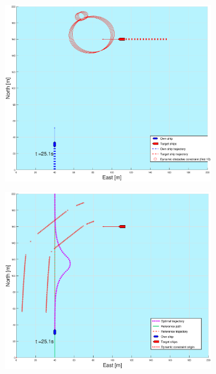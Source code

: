 \begin{figure}[!b]
\begin{subfigure}[b]{0.499\textwidth}
    \end{subfigure}
    \hfill
    \\
    \begin{subfigure}[b]{0.49\textwidth}
        \centering
        \includegraphics[width=\textwidth]{Images/Figures/sving_HO/_Simple_0fig1_time=25}
    \end{subfigure}
    \hfill
    \begin{subfigure}[b]{0.499\textwidth}
        \centering
        \includegraphics[width=\textwidth]{Images/Figures/sving_HO/_Simple_0fig999_time=25}

\end{subfigure}
\end{figure}
